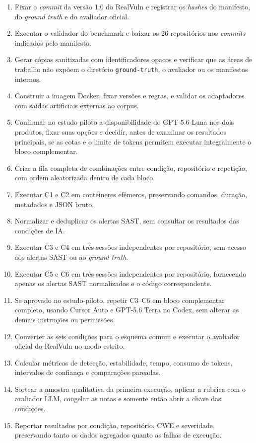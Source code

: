 \begin{enumerate}
\item Fixar o \textit{commit} da versão 1.0 do RealVuln e registrar os \textit{hashes} do manifesto, do \textit{ground truth} e do avaliador oficial.
\item Executar o validador do benchmark e baixar os 26 repositórios nos \textit{commits} indicados pelo manifesto.
\item Gerar cópias sanitizadas com identificadores opacos e verificar que as áreas de trabalho não expõem o diretório \texttt{ground-truth}, o avaliador ou os manifestos internos.
\item Construir a imagem Docker, fixar versões e regras, e validar os adaptadores com saídas artificiais externas ao corpus.
\item Confirmar no estudo-piloto a disponibilidade do GPT-5.6 Luna nos dois produtos, fixar suas opções e decidir, antes de examinar os resultados principais, se as cotas e o limite de tokens permitem executar integralmente o bloco complementar.
\item Criar a fila completa de combinações entre condição, repositório e repetição, com ordem aleatorizada dentro de cada bloco.
\item Executar C1 e C2 em contêineres efêmeros, preservando comandos, duração, metadados e JSON bruto.
\item Normalizar e deduplicar os alertas SAST, sem consultar os resultados das condições de IA.
\item Executar C3 e C4 em três sessões independentes por repositório, sem acesso aos alertas SAST ou ao \textit{ground truth}.
\item Executar C5 e C6 em três sessões independentes por repositório, fornecendo apenas os alertas SAST normalizados e o código correspondente.
\item Se aprovado no estudo-piloto, repetir C3--C6 em bloco complementar completo, usando Cursor Auto e GPT-5.6 Terra no Codex, sem alterar as demais instruções ou permissões.
\item Converter as seis condições para o esquema comum e executar o avaliador oficial do RealVuln no modo estrito.
\item Calcular métricas de detecção, estabilidade, tempo, consumo de tokens, intervalos de confiança e comparações pareadas.
\item Sortear a amostra qualitativa da primeira execução, aplicar a rubrica com o avaliador LLM, congelar as notas e somente então abrir a chave das condições.
\item Reportar resultados por condição, repositório, CWE e severidade, preservando tanto os dados agregados quanto as falhas de execução.
\end{enumerate}

